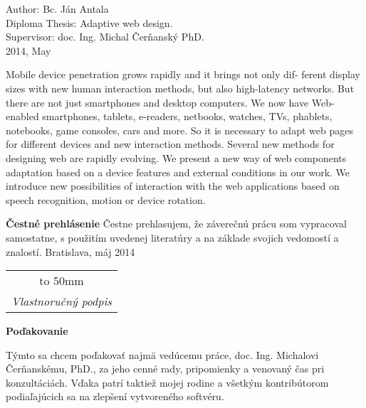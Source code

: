 Author: Bc. Ján Antala\\
Diploma Thesis: Adaptive web design. \\
Supervisor: doc. Ing. Michal Čerňanský PhD. \\
2014, May
\newline

Mobile device penetration grows rapidly and it brings not only dif- ferent display sizes with new human interaction methods, but also high-latency networks. But there are not just smartphones and desktop computers. We now have Web-enabled smartphones, tablets, e-readers, netbooks, watches, TVs, phablets, notebooks, game consoles, cars and more. So it is necessary to adapt web pages for different devices and new interaction methods. Several new methods for designing web are rapidly evolving. We present a new way of web components adaptation based on a device features and external conditions in our work. We introduce new possibilities of interaction with the web applications based on speech recognition, motion or device rotation.


\pagebreak
\thispagestyle{empty}
\bigskip\vfil
 \noindent\textbf{Čestné prehlásenie}
\newline\newline
Čestne prehlasujem, že záverečnú prácu som vypracoval samostatne, s použitím uvedenej
literatúry a na základe svojich vedomostí a znalostí.
\newline\newline
\noindent Bratislava, máj 2014 \hfil
\begin{tabular}[t]{c}
\hbox to 50mm {\dotfill} \\ \textit{\small Vlastnoručný podpis}
\end{tabular}\qquad\linebreak

\pagebreak
\thispagestyle{empty}
\bigskip\vfil
 \noindent\textbf{Poďakovanie}
\bigskip

Týmto sa chcem poďakovať najmä vedúcemu práce, doc. Ing. Michalovi Čerňanskému, PhD.,
za jeho cenné rady, pripomienky a venovaný čas pri konzultáciách. Vďaka patrí taktiež mojej rodine a všetkým kontribútorom podiaľajúcich sa na zlepšení vytvoreného softvéru.
\pagebreak

\newpage
\setcounter{page}{1}
\thispagestyle{empty}
\setcounter{tocdepth}{3}
\tableofcontents %
\newpage 
\thispagestyle{empty}
\listoftables
\newpage
\thispagestyle{empty}
\listoffigures 
\newpage

